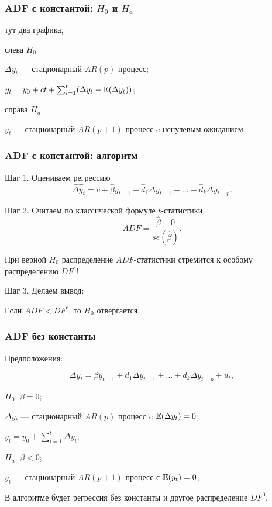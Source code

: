 \begin{frame}
  \frametitle{ADF с константой: $H_0$ и $H_a$}


  тут два графика,


  слева $H_0$

  $\Delta y_t$ — стационарный $AR(p)$ процесс;

  $y_t = y_0 + ct + \sum_{i=1}^t (\Delta y_t - \mathbb{E}(\Delta y_t))$;


  справа $H_a$

  $y_t$ — стационарный $AR(p + 1)$ процесс c ненулевым ожиданием

\end{frame}

\begin{frame}
  \frametitle{ADF с константой: алгоритм}

  Шаг 1. Оцениваем \alert{регрессию}
  \[
    \widehat{\Delta y_t} = \hat c + \hat \beta y_{t-1} + \hat d_1 \Delta y_{t-1} + \ldots + \hat d_k \Delta y_{t-p}.  
  \]

  \pause
  Шаг 2. Считаем по \alert{классической формуле} $t$-статистики
  \[
  ADF = \frac{\hat \beta -  0}{se(\hat \beta)}.  
  \]

  \pause
  При верной $H_0$ распределение $ADF$-статистики стремится к \alert{особому распределению} $DF^c$!

  \pause 
  Шаг 3. Делаем вывод:
  
  Если $ADF < DF^c$, то $H_0$ отвергается. 

\end{frame}


\begin{frame}
  \frametitle{ADF без константы}


  Предположения:

  \[
  \Delta y_t = \beta y_{t-1} + d_1 \Delta y_{t-1} + \ldots + d_k \Delta y_{t-p} + u_t,  
  \]

  \pause

  $H_0$: $\beta = 0$;
  
  $\Delta y_t$ — стационарный $AR(p)$ процесс c $\mathbb{E}(\Delta y_t) = 0$;

  $y_t = y_0 + \sum_{i=1}^t \Delta y_t $;

  \pause

  $H_a$: $\beta < 0$;

  $y_t$ — стационарный $AR(p + 1)$ процесс с $\mathbb{E}(y_t) = 0$;

  \pause 

  В алгоритме будет \alert{регрессия без константы} и другое распределение $DF^0$.

\end{frame}


